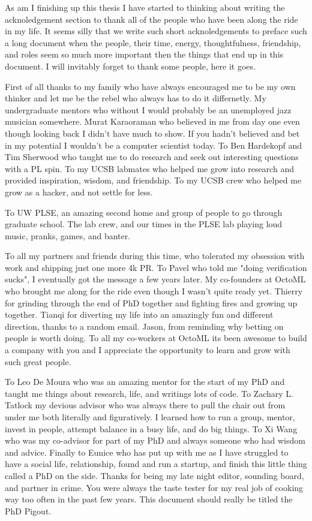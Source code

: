 As am I finishing up this thesis I have started to thinking about writing the
    acknoledgement section to thank all of the people who have been along the ride
    in my life.
It seems silly that we write such short acknoledgements to preface such a long
    document when the people, their time, energy, thoughtfulness, friendship,
    and roles seem so much more important then the things that end up in this
    document.
I will invitably forget to thank some people, here it goes.

First of all thanks to my family who have always encouraged
    me to be my own thinker and let me be the rebel who
    always has to do it differnetly.
My undergraduate mentors who without I would probably be an unemployed
    jazz musician somewhere.
Murat Karaoraman who believed in me from day one even though looking
    back I didn't have much to show.
If you hadn't believed and bet in my potential I wouldn't be a computer scientist today.
To Ben Hardekopf and Tim Sherwood who taught me to do research
    and seek out interesting questions with a PL spin.
To my UCSB labmates who helped me grow into research and
    provided inspiration, wisdom, and friendship.
To my UCSB crew who helped me grow as a hacker, and
    not settle for less.

To UW PLSE, an amazing second home and group of people to
    go through graduate school.
The lab crew, and our times in the PLSE lab playing loud
    music, pranks, games, and banter.



To all my partners and friends during this time, who tolerated
    my obsession with work and shipping just one more 4k PR.
To Pavel who told me "doing verification sucks",
    I eventually got the message a few years later.
My co-founders at OctoML who brought me along for the ride
    even though I wasn't quite ready yet.
Thierry for grinding through the end of PhD together and
    fighting fires and growing up together.
Tianqi for diverting my life into an amazingly fun and
    different direction, thanks to a random email.
Jason, from reminding why betting on people is worth doing.
To all my co-workers at OctoML its been awesome to build
    a company with you and I appreciate the opportunity to
    learn and grow with such great people.

To Leo De Moura who was an amazing mentor for the start of
    my PhD and taught me things about research, life, and writings lots of code.
To Zachary L. Tatlock my devious advisor who was always there
    to pull the chair out from under me both literally and figuratively.
I learned how to run a group, mentor, invest in people, attempt
    balance in a busy life, and do big things.
To Xi Wang who was my co-advisor for part of my PhD
    and always someone who had wisdom and advice.
Finally to Eunice who has put up with me as I have struggled
    to have a social life, relationship, found and run a startup,
    and finish this little thing called a PhD on the side.
Thanks for being my late night editor, sounding board, and
    partner in crime.
You were always the taste tester for my real job
    of cooking way too often in the past few years.
This document should really be titled the PhD Pigout.
